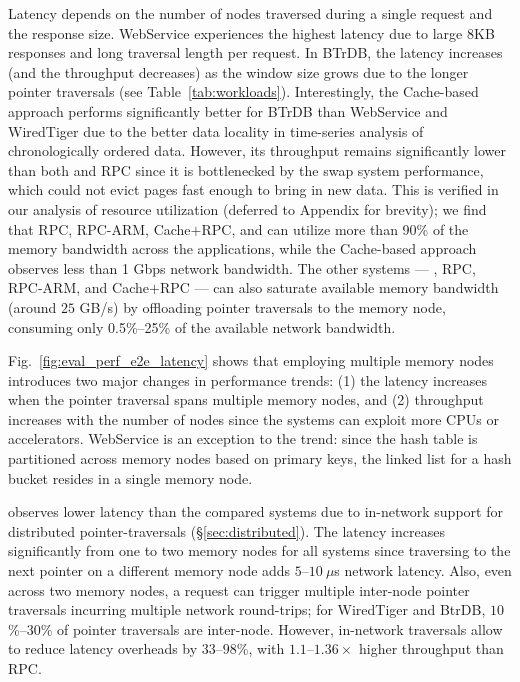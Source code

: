 Latency depends on the number of nodes traversed during a single request and the response size. WebService experiences the highest latency due to large 8KB responses and long traversal length per request. In BTrDB, the latency increases (and the throughput decreases) as the window size grows due to the longer pointer traversals (see Table~\ref{tab:workloads}). Interestingly, the Cache-based approach performs significantly better for BTrDB than WebService and WiredTiger due to the better data locality in time-series analysis of chronologically ordered data. However, its throughput remains significantly lower than both \pulse and RPC since it is bottlenecked by the swap system performance, which could not evict pages fast enough to bring in new data. This is verified in our analysis of resource utilization (deferred to Appendix for brevity); we find that RPC, RPC-ARM, Cache$+$RPC, and \pulse can utilize more than 90\% of the memory bandwidth across the applications, while the Cache-based approach observes less than 1 Gbps network bandwidth. The other systems --- \pulse, RPC, RPC-ARM, and Cache$+$RPC --- can also saturate available memory bandwidth (around $25$ GB/s) by offloading pointer traversals to the memory node, consuming only 0.5\%--25\% of the available network bandwidth. 

 Fig.~\ref{fig:eval_perf_e2e_latency} shows that employing multiple memory nodes introduces two major changes in performance trends: (1) the latency increases when the pointer traversal spans multiple memory nodes, and (2) throughput increases with the number of nodes since the systems can exploit more CPUs or accelerators. WebService is an exception to the trend: since the hash table is partitioned across memory nodes based on primary keys, the linked list for a hash bucket resides in a single memory node. 

\pulse observes lower latency than the compared systems due to in-network support for distributed pointer-traversals (\S\ref{sec:distributed}). The latency increases significantly from one to two memory nodes for all systems since traversing to the next pointer on a different memory node adds $5$--$10~\mu$s network latency. Also, even across two memory nodes, a request can trigger multiple inter-node pointer traversals incurring multiple network round-trips; for WiredTiger and BtrDB, $10$\%--$30$\% of pointer traversals are inter-node. However, in-network traversals allow \pulse to reduce latency overheads by $33$--$98$\%, with $1.1$--$1.36\times$ higher throughput than RPC.



